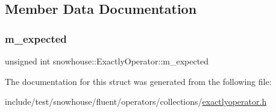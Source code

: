 \subsection{Member Data Documentation}
\mbox{\label{structsnowhouse_1_1ExactlyOperator_a0b37e44c30201b2c71b39f577340eb00}} 
\subsubsection{\texorpdfstring{m\_expected}{m\_expected}}
{\footnotesize\ttfamily unsigned int snowhouse\+::\+Exactly\+Operator\+::m\+\_\+expected}



The documentation for this struct was generated from the following file\+:\begin{DoxyCompactItemize}
\item 
include/test/snowhouse/fluent/operators/collections/\mbox{\hyperlink{exactlyoperator_8h}{exactlyoperator.\+h}}\end{DoxyCompactItemize}
